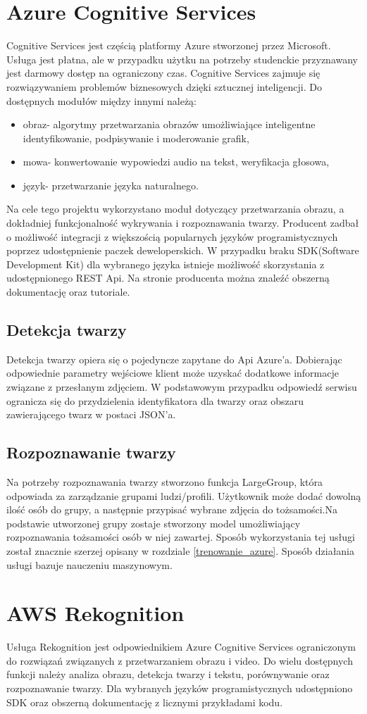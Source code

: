\section{Azure Cognitive Services}\label{azurecs}
Cognitive Services jest częścią platformy Azure stworzonej przez Microsoft. Usługa jest płatna, ale w przypadku użytku na potrzeby studenckie przyznawany jest darmowy dostęp na ograniczony czas. Cognitive Services zajmuje się rozwiązywaniem problemów biznesowych dzięki sztucznej inteligencji. Do dostępnych modułów między innymi należą:
\begin{itemize}
\item obraz- algorytmy przetwarzania obrazów umożliwiające inteligentne identyfikowanie, podpisywanie i moderowanie grafik,
\item mowa- konwertowanie wypowiedzi audio na tekst, weryfikacja głosowa,
\item język- przetwarzanie języka naturalnego.
\end{itemize}
Na cele tego projektu wykorzystano moduł dotyczący przetwarzania obrazu, a dokładniej funkcjonalność wykrywania i rozpoznawania twarzy. Producent zadbał o możliwość integracji z większością popularnych języków programistycznych poprzez udostępnienie paczek deweloperskich. W przypadku braku SDK(Software Development Kit) dla wybranego języka istnieje możliwość skorzystania z udostępnionego REST Api. Na stronie producenta można znaleźć obszerną dokumentację \cite{acs_doc} oraz tutoriale.

\subsection{Detekcja twarzy}
Detekcja twarzy opiera się o pojedyncze zapytane do Api Azure'a. Dobierając odpowiednie parametry wejściowe klient może uzyskać dodatkowe informacje związane z przesłanym zdjęciem. W podstawowym przypadku odpowiedź serwisu ogranicza się do przydzielenia identyfikatora dla twarzy oraz obszaru zawierającego twarz w postaci JSON'a.

\subsection{Rozpoznawanie twarzy}
Na potrzeby rozpoznawania twarzy stworzono funkcja LargeGroup, która odpowiada za zarządzanie grupami ludzi/profili. Użytkownik może dodać dowolną ilość osób do grupy, a następnie przypisać wybrane zdjęcia do tożsamości.Na podstawie utworzonej grupy zostaje stworzony model umożliwiający rozpoznawania tożsamości osób w niej zawartej. Sposób wykorzystania tej usługi został znacznie szerzej opisany w rozdziale \ref{trenowanie_azure}. Sposób działania usługi bazuje nauczeniu maszynowym.

\section{AWS Rekognition}
Usługa Rekognition jest odpowiednikiem Azure Cognitive Services ograniczonym do rozwiązań związanych z przetwarzaniem obrazu i video. Do wielu dostępnych funkcji należy analiza obrazu, detekcja twarzy i tekstu, porównywanie oraz rozpoznawanie twarzy. Dla wybranych języków programistycznych udostępniono SDK oraz obszerną dokumentację z licznymi przykładami kodu.

